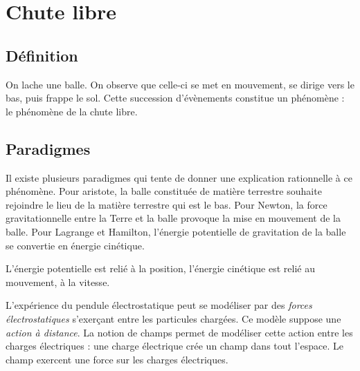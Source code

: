 
\section{Chute libre}
%
\subsection{Définition}

On lache une balle. On observe que celle-ci se met en mouvement, se dirige vers le bas, puis frappe le sol. Cette succession d'évènements constitue un phénomène : le phénomène de la chute libre.

\subsection{Paradigmes}

Il existe plusieurs paradigmes qui tente de donner une explication rationnelle à ce phénomène. Pour aristote, la balle constituée de matière terrestre souhaite rejoindre le lieu de la matière terrestre qui est le bas. Pour Newton, la force gravitationnelle entre la Terre et la balle provoque la mise en mouvement de la balle. Pour Lagrange et Hamilton, l'énergie potentielle de gravitation de la balle se convertie en énergie cinétique. 


L'énergie potentielle est relié à la position, l'énergie cinétique est relié au mouvement, à la vitesse.


L'expérience du pendule électrostatique peut se modéliser par des {\it forces électrostatiques} s'exerçant entre les particules chargées. Ce modèle suppose une {\it action à distance}. La notion de champs permet de modéliser cette action entre les charges électriques : une charge électrique crée un champ dans tout l'espace. Le champ exercent une force sur les charges électriques.


